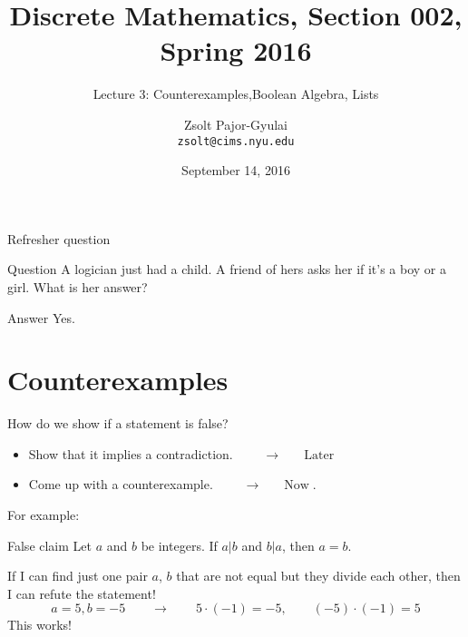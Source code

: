\documentclass{beamer}
\title{Discrete Mathematics, Section 002, Spring 2016}
\subtitle{Lecture 3: Counterexamples,Boolean Algebra, Lists
}
\author[Zsolt]{Zsolt Pajor-Gyulai \\ \texttt{zsolt@cims.nyu.edu}}
\date{September 14, 2016}
\institute[NYU] 
{
\normalsize Courant Institute of Mathematical Sciences
}
\begin{document}
\begin{frame}
  \titlepage
\end{frame}


\begin{frame}{Refresher question}
\begin{block}{Question}
A logician just had a child. A friend of hers asks her if it's a boy or a girl. What is her answer?
\end{block}\pause
\begin{block}{Answer}
Yes.
\end{block}
\end{frame}

\section{Counterexamples}

\begin{frame}{How do we show if a statement is false?}
\begin{itemize}
\item Show that it implies a contradiction. $\qquad\rightarrow\qquad\textrm{Later}$\pause
\item Come up with a counterexample. $\qquad\rightarrow\qquad\textrm{Now}$.
\end{itemize}\pause
\vspace{0.4cm}
For example:
\begin{block}{False claim}
Let $a$ and $b$ be integers. If $a|b$ and $b|a$, then $a=b$.
\end{block}\pause

If I can find just one pair $a$, $b$ that are not equal but they divide each other, then I can refute the statement!\pause
\[
a=5, b=-5\qquad\rightarrow\qquad 5\cdot (-1)=-5,\qquad (-5)\cdot (-1) = 5
\]
This works!
\end{frame}
\end{document}
